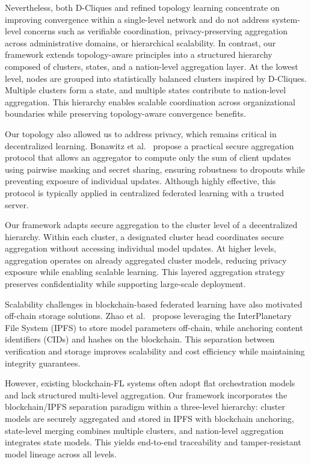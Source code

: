 Nevertheless, both D-Cliques and refined topology learning concentrate on improving convergence within a single-level network and do not address system-level concerns such as verifiable coordination, privacy-preserving aggregation across administrative domains, or hierarchical scalability. In contrast, our framework extends topology-aware principles into a structured hierarchy composed of clusters, states, and a nation-level aggregation layer. At the lowest level, nodes are grouped into statistically balanced clusters inspired by D-Cliques. Multiple clusters form a state, and multiple states contribute to nation-level aggregation. This hierarchy enables scalable coordination across organizational boundaries while preserving topology-aware convergence benefits.

Our topology also allowed us to address privacy, which remains critical in decentralized learning. Bonawitz et al.~\cite{SecureAggregation} propose a practical secure aggregation protocol that allows an aggregator to compute only the sum of client updates using pairwise masking and secret sharing, ensuring robustness to dropouts while preventing exposure of individual updates. Although highly effective, this protocol is typically applied in centralized federated learning with a trusted server.

Our framework adapts secure aggregation to the cluster level of a decentralized hierarchy. Within each cluster, a designated cluster head coordinates secure aggregation without accessing individual model updates. At higher levels, aggregation operates on already aggregated cluster models, reducing privacy exposure while enabling scalable learning. This layered aggregation strategy preserves confidentiality while supporting large-scale deployment.

Scalability challenges in blockchain-based federated learning have also motivated off-chain storage solutions. Zhao et al.~\cite{BCIOT} propose leveraging the InterPlanetary File System (IPFS) to store model parameters off-chain, while anchoring content identifiers (CIDs) and hashes on the blockchain. This separation between verification and storage improves scalability and cost efficiency while maintaining integrity guarantees.

However, existing blockchain-FL systems often adopt flat orchestration models and lack structured multi-level aggregation. Our framework incorporates the blockchain/IPFS separation paradigm within a three-level hierarchy: cluster models are securely aggregated and stored in IPFS with blockchain anchoring, state-level merging combines multiple clusters, and nation-level aggregation integrates state models. This yields end-to-end traceability and tamper-resistant model lineage across all levels.

